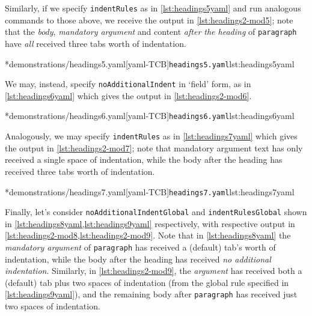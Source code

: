 	Similarly, if we specify \texttt{indentRules} as in \cref{lst:headings5yaml} and run
	analogous commands to those above, we receive the output in \cref{lst:headings2-mod5}; note
	that the \emph{body}, \emph{mandatory argument} and content
	\emph{after the heading} of \texttt{paragraph} have \emph{all} received
	three tabs worth of indentation.

        \begin{cmhtcbraster}[raster force size=false,
            raster column 1/.style={add to width=1cm},
            raster column 2/.style={add to width=-1cm},
            ]
		\cmhlistingsfromfile[style=yaml-LST]*{demonstrations/headings5.yaml}[yaml-TCB]{\texttt{headings5.yaml}}{lst:headings5yaml}
        \end{cmhtcbraster}

	We may, instead, specify \texttt{noAdditionalIndent} in `field' form, as in
	\cref{lst:headings6yaml} which gives the output in \cref{lst:headings2-mod6}.

        \begin{cmhtcbraster}
		\cmhlistingsfromfile[style=yaml-LST]*{demonstrations/headings6.yaml}[yaml-TCB]{\texttt{headings6.yaml}}{lst:headings6yaml}
        \end{cmhtcbraster}

	Analogously, we may specify \texttt{indentRules} as in \cref{lst:headings7yaml} which
	gives the output in \cref{lst:headings2-mod7}; note that mandatory argument text has only
	received a single space of indentation, while the body after the heading has received
	three tabs worth of indentation.

        \begin{cmhtcbraster}
		\cmhlistingsfromfile[style=yaml-LST]*{demonstrations/headings7.yaml}[yaml-TCB]{\texttt{headings7.yaml}}{lst:headings7yaml}
        \end{cmhtcbraster}

	Finally, let's consider \texttt{noAdditionalIndentGlobal} and \texttt{indentRulesGlobal} shown in
	\cref{lst:headings8yaml,lst:headings9yaml} respectively, with respective output in \cref{lst:headings2-mod8,lst:headings2-mod9}.
	Note that in \cref{lst:headings8yaml} the \emph{mandatory argument} of \texttt{paragraph}
	has received a (default) tab's worth of indentation, while the body after the heading has
	received \emph{no additional indentation}. Similarly, in \cref{lst:headings2-mod9}, the
	\emph{argument} has received both a (default) tab plus two spaces of indentation
	(from the global rule specified in \cref{lst:headings9yaml}), and the remaining body after
	\texttt{paragraph} has received just two spaces of indentation.

